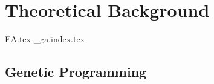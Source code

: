 \chapter{Theoretical Background}
\label{chap:theoretical_background}
  {EA.tex}
  {_ga.index.tex}

  \section{Genetic Programming}
  \label{sec:genetic_programming}
    \Blindtext